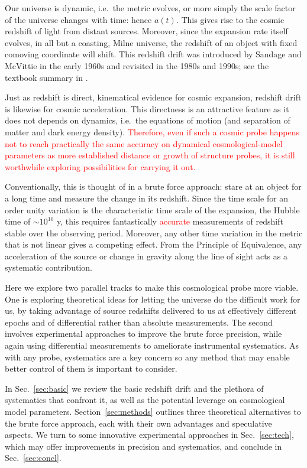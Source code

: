 \documentclass[preprint2, 10pt]{aastex}
\begin{document}
Our universe is dynamic, i.e.\ the metric evolves, or more simply the 
scale factor of the universe changes with time: hence $a(t)$.  This 
gives rise to the cosmic redshift of light from distant sources.  Moreover, 
since the expansion rate itself evolves, in all but a coasting, Milne 
universe, the redshift of an object with fixed comoving coordinate will shift.  This redshift drift was 
introduced by Sandage \citep{sandage} and McVittie \citep{mcvittie} in the 
early 1960s and revisited in the 1980s and 1990s; see the textbook 
summary in \citet{fpoc}. 

Just as redshift is direct, kinematical evidence for cosmic expansion, 
redshift drift is likewise for cosmic acceleration.  This directness is 
an attractive feature as it does not depends on dynamics, i.e.\ the equations 
of motion (and separation of matter and dark energy density). 
\textcolor{red}{Therefore, 
even if such a cosmic probe happens not to reach practically the same 
accuracy on dynamical cosmological-model parameters as more established
distance or growth of structure probes,  it is still worthwhile exploring possibilities 
for carrying it out. 
}

Conventionally, this is thought of in a brute force approach: stare at an 
object for a long time and measure the change in its redshift.  
Since the time scale for an order unity variation is the characteristic 
time scale of the expansion, the Hubble time of $\sim10^{10}$ y, this 
requires fantastically \textcolor{red}{accurate} measurements of redshift stable over the 
observing period.  Moreover, any other time variation in the metric that 
is not linear gives a competing effect.  From the Principle of Equivalence, 
any acceleration of the source or change in gravity along the line of sight 
acts as a systematic contribution. 

Here we explore two parallel tracks to make this cosmological probe more 
viable. One is exploring theoretical ideas for letting the universe do the 
difficult work for us, by taking advantage of source redshifts delivered 
to us at effectively different epochs and of differential rather than absolute 
measurements.  The second involves experimental approaches to improve the 
brute force precision, while again using differential measurements to 
ameliorate instrumental systematics. As with any probe, systematics are a 
key concern so any method that may enable better control of them is 
important to consider. 

In Sec.~\ref{sec:basic} we review the basic redshift drift and the plethora 
of systematics that confront it, as well as the potential leverage on 
cosmological model parameters.  Section~\ref{sec:methods} outlines three 
theoretical alternatives to the brute force approach, each with their own 
advantages and speculative aspects. 
We turn to some innovative experimental approaches in Sec.~\ref{sec:tech}, 
which may offer improvements in precision and systematics, and conclude in 
Sec.~\ref{sec:concl}. 
\end{document}
